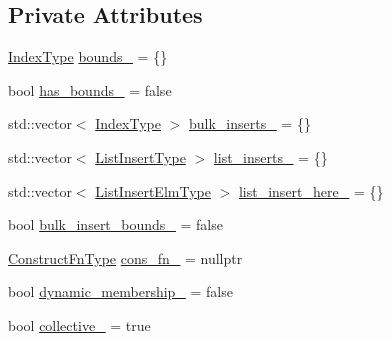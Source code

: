 \subsection*{Private Attributes}
\begin{DoxyCompactItemize}
\item 
\hyperlink{structvt_1_1vrt_1_1collection_1_1param_1_1_construct_params_a7bc8d5d57e377e0f2e60031582eeb7e6}{Index\+Type} \hyperlink{structvt_1_1vrt_1_1collection_1_1param_1_1_construct_params_a07775dd24ad9720f285dfcdc1cb67183}{bounds\+\_\+} = \{\}
\item 
bool \hyperlink{structvt_1_1vrt_1_1collection_1_1param_1_1_construct_params_aa95c1b3041766b6ad0b804abb9a5f356}{has\+\_\+bounds\+\_\+} = false
\item 
std\+::vector$<$ \hyperlink{structvt_1_1vrt_1_1collection_1_1param_1_1_construct_params_a7bc8d5d57e377e0f2e60031582eeb7e6}{Index\+Type} $>$ \hyperlink{structvt_1_1vrt_1_1collection_1_1param_1_1_construct_params_a4de8932b1c4f4e4e0998630cbe6ed08f}{bulk\+\_\+inserts\+\_\+} = \{\}
\item 
std\+::vector$<$ \hyperlink{structvt_1_1vrt_1_1collection_1_1param_1_1_construct_params_aabef3a4ec2a70d29d2b5161daf66e153}{List\+Insert\+Type} $>$ \hyperlink{structvt_1_1vrt_1_1collection_1_1param_1_1_construct_params_a46f83ed1ec69ebea9d27112fc2d90ce6}{list\+\_\+inserts\+\_\+} = \{\}
\item 
std\+::vector$<$ \hyperlink{structvt_1_1vrt_1_1collection_1_1param_1_1_construct_params_ac04e58216ca54c39b91f15f6bb46afc9}{List\+Insert\+Elm\+Type} $>$ \hyperlink{structvt_1_1vrt_1_1collection_1_1param_1_1_construct_params_a8ffde01cec988a409f7858f27e0c99a1}{list\+\_\+insert\+\_\+here\+\_\+} = \{\}
\item 
bool \hyperlink{structvt_1_1vrt_1_1collection_1_1param_1_1_construct_params_aa847998b769d10a8badfc95543113f52}{bulk\+\_\+insert\+\_\+bounds\+\_\+} = false
\item 
\hyperlink{structvt_1_1vrt_1_1collection_1_1param_1_1_construct_params_a7ad7bdf4220701e54b485f45e08b1736}{Construct\+Fn\+Type} \hyperlink{structvt_1_1vrt_1_1collection_1_1param_1_1_construct_params_a2321e2cd2e2ca8086ed5c4fa691a8900}{cons\+\_\+fn\+\_\+} = nullptr
\item 
bool \hyperlink{structvt_1_1vrt_1_1collection_1_1param_1_1_construct_params_ab032b5a40a6ffdd0b763af5968cec42a}{dynamic\+\_\+membership\+\_\+} = false
\item 
bool \hyperlink{structvt_1_1vrt_1_1collection_1_1param_1_1_construct_params_ac642a152bed0d228e9831b4e9b5d3ca4}{collective\+\_\+} = true

\end{DoxyCompactItemize}
